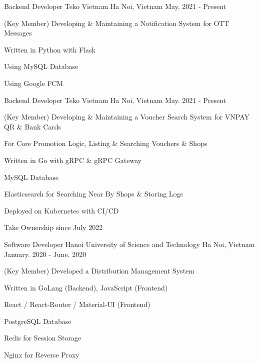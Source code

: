 \begin{cventries}

\cventry
{Backend Developer} %
{Teko Vietnam} %
{Ha Noi, Vietnam} %
{May. 2021 - Present} %
{ %
\begin{cvitems}
\item{(Key Member) Developing \& Maintaining a Notification System for OTT Messages}
\item{Written in Python with Flask}
\item{Using MySQL Database}
\item{Using Google FCM}
\end{cvitems}
}


\cventry
{Backend Developer} %
{Teko Vietnam} %
{Ha Noi, Vietnam} %
{May. 2021 - Present} %
{ %
\begin{cvitems}
\item{(Key Member) Developing \& Maintaining a Voucher Search System for VNPAY QR \& Bank Cards}
\item{For Core Promotion Logic, Listing \& Searching Vouchers \& Shops}
\item{Written in Go with gRPC \& gRPC Gateway}
\item{MySQL Database}
\item{Elasticsearch for Searching Near By Shops \& Storing Logs}
\item{Deployed on Kubernetes with CI/CD}
\item{Take Ownership since July 2022}
\end{cvitems}
}


\cventry
{Software Developer} %
{Hanoi University of Science and Technology} %
{Ha Noi, Vietnam} %
{January. 2020 - June. 2020} %
{ %
\begin{cvitems}
\item{(Key Member) Developed a Distribution Management System}
\item{Written in GoLang (Backend), JavaScript (Frontend)}
\item{React / React-Router / Material-UI (Frontend)}
\item{PostgreSQL Database}
\item{Redis for Session Storage}
\item{Nginx for Reverse Proxy}
\end{cvitems}
}


\end{cventries}
